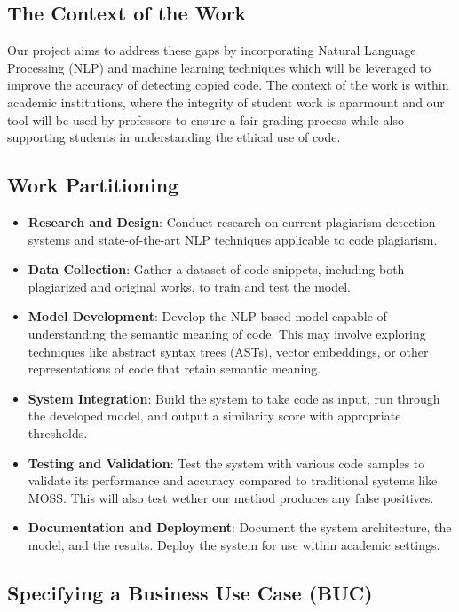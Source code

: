 \documentclass[12pt]{article}
\begin{document}
\subsection{The Context of the Work}
Our project aims to address these gaps by incorporating Natural Language Processing (NLP) and machine learning techniques
which will be leveraged to improve the accuracy of detecting copied code. The context of the work is within academic institutions,
where the integrity of student work is aparmount and our tool will be used by professors to ensure a fair grading process
while also supporting students in understanding the ethical use of code.
\subsection{Work Partitioning}
\begin{itemize}
  \item \textbf{Research and Design}: Conduct research on current plagiarism detection systems and state-of-the-art NLP techniques applicable to code plagiarism.
  
  \item \textbf{Data Collection}: Gather a dataset of code snippets, including both plagiarized and original works, to train and test the model.
  
  \item \textbf{Model Development}: Develop the NLP-based model capable of understanding the semantic meaning of code. This may involve exploring techniques like abstract syntax trees (ASTs), vector embeddings, or other representations of code that retain semantic meaning.
  
  \item \textbf{System Integration}: Build the system to take code as input, run through the developed model, and output a similarity score with appropriate thresholds.
  
  \item \textbf{Testing and Validation}: Test the system with various code samples to validate its performance and accuracy compared to traditional systems like MOSS. This will also test wether our method produces any false positives.
  
  \item \textbf{Documentation and Deployment}: Document the system architecture, the model, and the results. Deploy the system for use within academic settings.
\end{itemize}
\subsection{Specifying a Business Use Case (BUC)}
\end{document}
